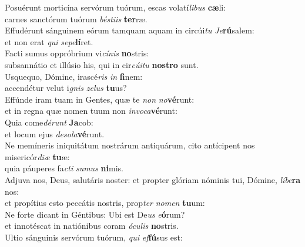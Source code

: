 \evenverse Posuérunt morticína servórum tuórum, escas volatí\textit{li}\textit{bus} \textbf{cæ}li:~\*\\
\evenverse carnes sanctórum tuórum \textit{bé}\textit{sti}\textit{is} \textbf{ter}ræ.\\
\oddverse Effudérunt sánguinem eórum tamquam aquam in circúi\textit{tu} \textit{Je}\textbf{rú}salem:~\*\\
\oddverse et non erat \textit{qui} \textit{se}\textit{pe}\textbf{lí}ret.\\
\evenverse Facti sumus oppróbrium vi\textit{cí}\textit{nis} \textbf{no}stris:~\*\\
\evenverse subsannátio et illúsio his, qui in cir\textit{cú}\textit{i}\textit{tu} \textbf{no}\textbf{stro} sunt.\\
\oddverse Usquequo, Dómine, irascé\textit{ris} \textit{in} \textbf{fi}nem:~\*\\
\oddverse accendétur velut i\textit{gnis} \textit{ze}\textit{lus} \textbf{tu}us?\\
\evenverse Effúnde iram tuam in Gentes, quæ te \textit{non} \textit{no}\textbf{vé}runt:~\*\\
\evenverse et in regna quæ nomen tuum non \textit{in}\textit{vo}\textit{ca}\textbf{vé}runt:\\
\oddverse Quia come\textit{dé}\textit{runt} \textbf{Ja}cob:~\*\\
\oddverse et locum ejus \textit{de}\textit{so}\textit{la}\textbf{vé}runt.\\
\evenverse Ne memíneris iniquitátum nostrárum antiquárum, cito antícipent nos misericór\textit{di}\textit{æ} \textbf{tu}æ:~\*\\
\evenverse quia páuperes fa\textit{cti} \textit{su}\textit{mus} \textbf{ni}mis.\\
\oddverse Adjuva nos, Deus, salutáris noster: et propter glóriam nóminis tui, Dómine, \textit{lí}\textit{be}\textbf{ra} nos:~\*\\
\oddverse et propítius esto peccátis nostris, prop\textit{ter} \textit{no}\textit{men} \textbf{tu}um:\\
\evenverse Ne forte dicant in Géntibus: Ubi est De\textit{us} \textit{e}\textbf{ó}rum?~\*\\
\evenverse et innotéscat in natiónibus coram \textit{ó}\textit{cu}\textit{lis} \textbf{no}stris.\\
\oddverse Ultio sánguinis servórum tuórum, \textit{qui} \textit{ef}\textbf{fú}sus est:~\*\\
